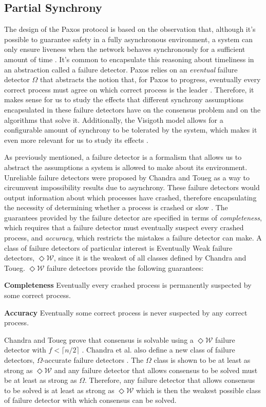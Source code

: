 \documentclass[runningheads,a4paper]{llncs}
\begin{document}
\subsection{Partial Synchrony} \label{Partial Synchrony}
The design of the Paxos protocol is based on the observation that, although it's possible to guarantee safety in a fully asynchronous environment, a system can only ensure liveness when the network behaves synchronously for a sufficient amount of time \cite{Lamport2001}. It's common to encapsulate this reasoning about timeliness in an abstraction called a failure detector. Paxos relies on an \textit{eventual} failure detector $\Omega$ that abstracts the notion that, for Paxos to progress, eventually every correct process must agree on which correct process is the leader \cite{vukolic2012quorum}. Therefore, it makes sense for us to study the effects that different synchrony assumptions encapsulated in these failure detectors have on the consensus problem and on the algorithms that solve it. Additionally, the Visigoth model allows for a configurable amount of synchrony to be tolerated by the system, which makes it even more relevant for us to study its effects \cite{Porto2015}. \par
As previously mentioned, a failure detector is a formalism that allows us to abstract the assumptions a system is allowed to make about its environment. Unreliable failure detectors were proposed by Chandra and Toueg as a way to circumvent impossibility results due to asynchrony. These failure detectors would output information about which processes have crashed, therefore encapsulating the necessity of determining whether a process is crashed or slow \cite{DeepakChandra1996}. The guarantees provided by the failure detector are specified in terms of \textit{completeness}, which requires that a failure detector must eventually suspect every crashed process, and \textit{accuracy}, which restricts the mistakes a failure detector can make. A class of failure detectors of particular interest is Eventually Weak failure detectors, $\Diamond\mathcal{W}$, since it is the weakest of all classes defined by Chandra and Toueg. $\Diamond\mathcal{W}$ failure detectors provide the following guarantees:\par
\textbf{Completeness} Eventually every crashed process is permanently suspected by some correct process.\par
\textbf{Accuracy} Eventually some correct process is never suspected by any correct process.\par
Chandra and Toueg prove that consensus is solvable using a $\Diamond\mathcal{W}$ failure detector with $f < \lceil n/2 \rceil$ \cite{DeepakChandra1996}. Chandra et al. also define a new class of failure detectors, $\Omega$-accurate failure detectors \cite{Chandra1996}. The $\Omega$ class is shown to be at least as strong as $\Diamond\mathcal{W}$ and any failure detector that allows consensus to be solved must be at least as strong as $\Omega$. Therefore, any failure detector that allows consensus to be solved is at least as strong as $\Diamond\mathcal{W}$ which is then the weakest possible class of failure detector with which consensus can be solved. \par
\end{document}
